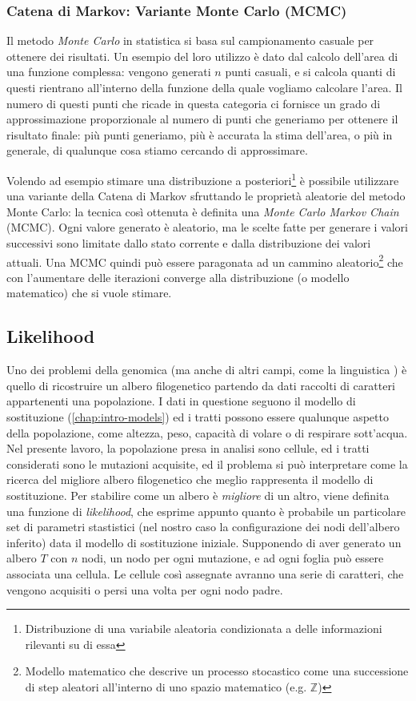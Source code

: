 \subsubsection{Catena di Markov: Variante Monte Carlo (MCMC)}
\label{chap:intro-extra-markov-mc}
Il metodo \textit{Monte Carlo} in statistica si basa sul campionamento casuale per ottenere dei risultati. Un esempio del loro utilizzo è dato dal calcolo dell'area di una funzione complessa: vengono generati $n$ punti casuali, e si calcola quanti di questi rientrano all'interno della funzione della quale vogliamo calcolare l'area. Il numero di questi punti che ricade in questa categoria ci fornisce un grado di approssimazione proporzionale al numero di punti che generiamo per ottenere il risultato finale: più punti generiamo, più è accurata la stima dell'area, o più in generale, di qualunque cosa stiamo cercando di approssimare.

Volendo ad esempio stimare una distribuzione a posteriori\footnote{Distribuzione di una variabile aleatoria condizionata a delle informazioni rilevanti su di essa} è possibile utilizzare una variante della Catena di Markov sfruttando le proprietà aleatorie del metodo Monte Carlo: la tecnica così ottenuta è definita una \textit{Monte Carlo Markov Chain} (MCMC). Ogni valore generato è aleatorio, ma le scelte fatte per generare i valori successivi sono limitate dallo stato corrente e dalla distribuzione dei valori attuali. Una MCMC quindi può essere paragonata ad un cammino aleatorio\footnote{Modello matematico che descrive un processo stocastico come una successione di step aleatori all'interno di uno spazio matematico (e.g. $\mathbb{Z}$)} che con l'aumentare delle iterazioni converge alla distribuzione (o modello matematico) che si vuole stimare.

\subsection{Likelihood}
\label{chap:intro-extra-lh}
Uno dei problemi della genomica (ma anche di altri campi, come la linguistica \cite{phylogenylinguistical}) è quello di ricostruire un albero filogenetico partendo da dati raccolti di caratteri appartenenti una popolazione. I dati in questione seguono il modello di sostituzione (\autoref{chap:intro-models}) ed i tratti possono essere qualunque aspetto della popolazione, come altezza, peso, capacità di volare o di respirare sott'acqua. Nel presente lavoro, la popolazione presa in analisi sono cellule, ed i tratti considerati sono le mutazioni acquisite, ed il problema si può interpretare come la ricerca del migliore albero filogenetico che meglio rappresenta il modello di sostituzione. Per stabilire come un albero è \textit{migliore} di un altro, viene definita una funzione di \textit{likelihood}, che esprime appunto quanto è probabile un particolare set di parametri stastistici (nel nostro caso la configurazione dei nodi dell'albero inferito) data il modello di sostituzione iniziale. Supponendo di aver generato un albero $T$ con $n$ nodi, un nodo per ogni mutazione, e ad ogni foglia può essere associata una cellula. Le cellule così assegnate avranno una serie di caratteri, che vengono acquisiti o persi una volta per ogni nodo padre.

